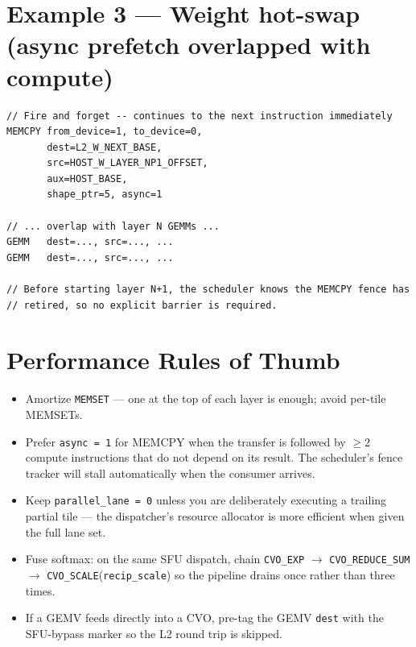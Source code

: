 \documentclass[11pt,a4paper,twoside,openany]{report}
\begin{document}
\section{Example 3 --- Weight hot-swap (async prefetch overlapped with compute)}

\begin{lstlisting}[style=sv]
// Fire and forget -- continues to the next instruction immediately
MEMCPY from_device=1, to_device=0,
       dest=L2_W_NEXT_BASE,
       src=HOST_W_LAYER_NP1_OFFSET,
       aux=HOST_BASE,
       shape_ptr=5, async=1

// ... overlap with layer N GEMMs ...
GEMM   dest=..., src=..., ...
GEMM   dest=..., src=..., ...

// Before starting layer N+1, the scheduler knows the MEMCPY fence has
// retired, so no explicit barrier is required.
\end{lstlisting}

\section{Performance Rules of Thumb}

\begin{itemize}[label={\color{oceanblue}\textbullet}, leftmargin=*, itemsep=0.3ex]
    \item Amortize \texttt{MEMSET} --- one at the top of each layer is
          enough; avoid per-tile MEMSETs.
    \item Prefer \texttt{async = 1} for MEMCPY when the transfer is
          followed by $\ge 2$ compute instructions that do not depend
          on its result. The scheduler's fence tracker will stall
          automatically when the consumer arrives.
    \item Keep \texttt{parallel\_lane = 0} unless you are deliberately
          executing a trailing partial tile — the dispatcher's
          resource allocator is more efficient when given the full
          lane set.
    \item Fuse softmax: on the same SFU dispatch, chain
          \texttt{CVO\_EXP} $\to$ \texttt{CVO\_REDUCE\_SUM} $\to$
          \texttt{CVO\_SCALE}\allowbreak(\texttt{recip\_scale}) so the
          pipeline drains once rather than three times.
    \item If a GEMV feeds directly into a CVO, pre-tag the GEMV
          \texttt{dest} with the SFU-bypass marker so the L2 round
          trip is skipped.
\end{itemize}
\end{document}
